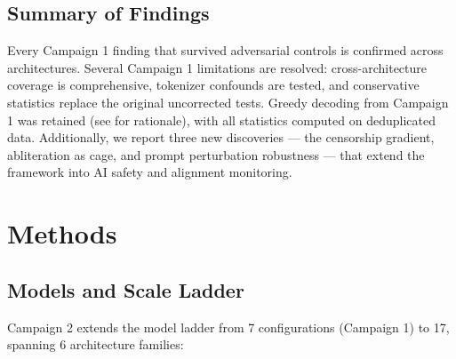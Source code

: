 \documentclass[11pt,a4paper]{article}
\begin{document}
\subsection{Summary of Findings}

Every Campaign 1 finding that survived adversarial controls is confirmed across architectures. Several Campaign 1 limitations are resolved: cross-architecture coverage is comprehensive, tokenizer confounds are tested, and conservative statistics replace the original uncorrected tests. Greedy decoding from Campaign 1 was retained (see  for rationale), with all statistics computed on deduplicated data. Additionally, we report three new discoveries --- the censorship gradient, abliteration as cage, and prompt perturbation robustness --- that extend the framework into AI safety and alignment monitoring.

\section{Methods}
\label{sec:methods}

\subsection{Models and Scale Ladder}

Campaign 2 extends the model ladder from 7 configurations (Campaign 1) to 17, spanning 6 architecture families:
\end{document}
